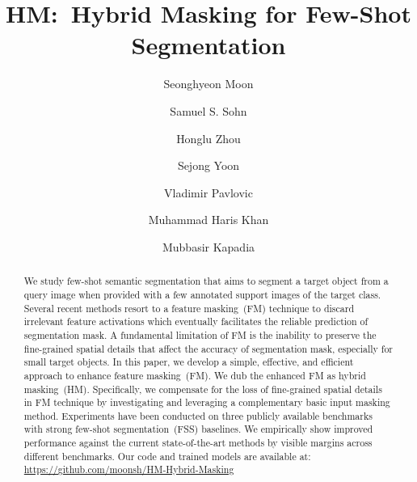 \documentclass[runningheads]{llncs}
\begin{document}
\pagestyle{headings}
\mainmatter
\def\ECCVSubNumber{7077}  

\title{HM:~Hybrid Masking for Few-Shot Segmentation} 

\begin{comment}
\titlerunning{ECCV-22 submission ID \ECCVSubNumber} 
\authorrunning{ECCV-22 submission ID \ECCVSubNumber} 
\author{Anonymous ECCV submission}
\institute{Paper ID \ECCVSubNumber}
\end{comment}


\author{Seonghyeon Moon \and
Samuel S. Sohn \and
Honglu Zhou \and
Sejong Yoon \and
Vladimir Pavlovic \and
Muhammad Haris Khan \and
Mubbasir Kapadia 
} 

\maketitle

\newcommand\red[1]{\textcolor{red}{#1}}
\newcommand\blue[1]{\textcolor{blue}{#1}}

\newcommand\revis[2]{\red{\st{#1}} \blue{#2}}

\newcommand\train[1]{}
\newcommand\test[1]{}
 
\begin{abstract}
We study few-shot semantic segmentation that aims to segment a target object from a query image when provided with a few annotated support images of the target class. 
Several recent methods resort to a feature masking~(FM) technique to discard irrelevant feature activations which eventually facilitates the reliable prediction of segmentation mask. A fundamental limitation of FM is the inability to preserve the fine-grained spatial details that affect the accuracy of segmentation mask, especially for small target objects.
In this paper, we develop a simple, effective, and efficient approach to enhance feature masking~(FM). We dub the enhanced FM as hybrid masking~(HM). Specifically, we compensate for the loss of fine-grained spatial details in FM technique by investigating and leveraging a complementary basic input masking method.
Experiments have been conducted on three publicly available benchmarks with strong few-shot segmentation~(FSS) baselines.
We empirically show improved performance against the current state-of-the-art methods by visible margins across different benchmarks.
Our code and trained models are available at: \url{https://github.com/moonsh/HM-Hybrid-Masking}



\end{abstract}
\end{document}
